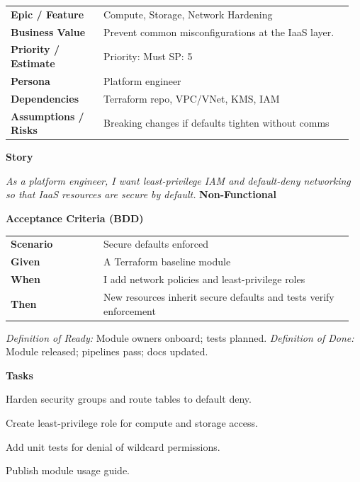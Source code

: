 \documentclass[11pt,letterpaper]{article}
\makeatletter
\newenvironment{kvtable}{%
  \begin{tabular}{@{}>{\bfseries\arraybackslash}p{0.26\linewidth} p{0.70\linewidth}@{}}
}{\end{tabular}}
\newenvironment{bdd}{%
  \begin{tabular}{@{}>{\bfseries\arraybackslash}p{0.26\linewidth} p{0.70\linewidth}@{}}
}{\end{tabular}}
\newcommand{\DoRDoD}[2]{%
  \vspace{0.35em}
  {\footnotesize\color{Muted}%
    \textit{Definition of Ready:} #1 \; \textbullet\;
    \textit{Definition of Done:} #2%
  }%
}
\newenvironment{storycard}[2]{%
  \begin{tcolorbox}[cloudcard, title={#1 --- #2}]%
}{\end{tcolorbox}}
\newcommand{\sectionlabel}[1]{\vspace{0.35em}\textbf{#1}\par}
\makeatother
\begin{document}
\begin{storycard}{CCS-5}{Ch. 5 — IaaS Focus}
\begin{kvtable}
Epic / Feature & Compute, Storage, Network Hardening\\
Business Value & Prevent common misconfigurations at the IaaS layer.\\
Priority / Estimate & Priority: Must \quad SP: 5\\
Persona & Platform engineer\\
Dependencies & Terraform repo, VPC/VNet, KMS, IAM\\
Assumptions / Risks & Breaking changes if defaults tighten without comms\\
\end{kvtable}
\sectionlabel{Story}
\textit{As a platform engineer, I want least-privilege IAM and default-deny networking so that IaaS resources are secure by default.}
\sectionlabel{Non-Functional}\;
\sectionlabel{Acceptance Criteria (BDD)}
\begin{bdd}
Scenario & Secure defaults enforced\\
Given & A Terraform baseline module\\
When & I add network policies and least-privilege roles\\
Then & New resources inherit secure defaults and tests verify enforcement\\
\end{bdd}
\DoRDoD{Module owners onboard; tests planned.}{Module released; pipelines pass; docs updated.}
\sectionlabel{Tasks}
\begin{checklist}
\item Harden security groups and route tables to default deny.
\item Create least-privilege role for compute and storage access.
\item Add unit tests for denial of wildcard permissions.
\item Publish module usage guide.
\end{checklist}
\end{storycard}
\end{document}
